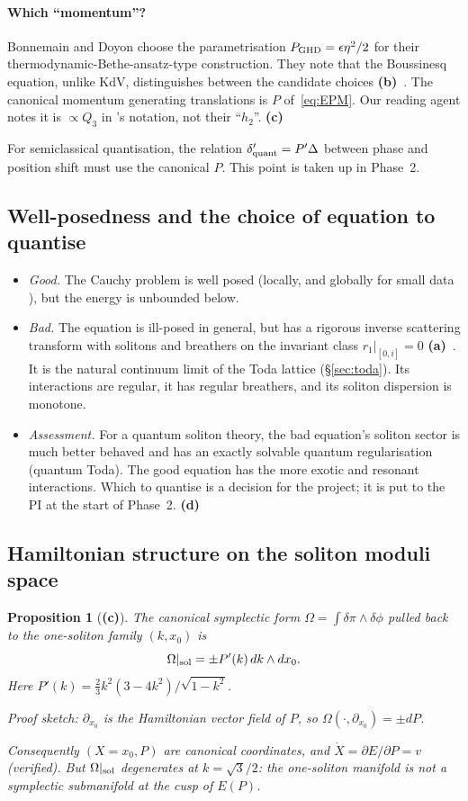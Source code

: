 \documentclass[11pt,a4paper]{article}
\newcommand{\La}{\textsf{\textbf{(a)}}}
\newcommand{\Lb}{\textsf{\textbf{(b)}}}
\newcommand{\Lc}{\textsf{\textbf{(c)}}}
\newcommand{\Ld}{\textsf{\textbf{(d)}}}
\newtheorem{proposition}{Proposition}[section]
\theoremstyle{remark}
\begin{document}
\paragraph{Which ``momentum''?} Bonnemain and Doyon choose the parametrisation $P_{\rm GHD}=\epsilon\eta^2/2$ for their thermodynamic-Bethe-ansatz-type construction. They note that the Boussinesq equation, unlike KdV, distinguishes between the candidate choices \Lb~\cite[(42)--(45)]{BD}. The canonical momentum generating translations is $P$ of~\eqref{eq:EPM}. Our reading agent notes it is $\propto Q_3$ in \cite{BD}'s notation, not their ``$h_2$''. \Lc

For semiclassical quantisation, the relation $\delta_{\rm quant}'=P'\Delta$ between phase and position shift must use the canonical $P$. This point is taken up in Phase~2.

\subsection{Well-posedness and the choice of equation to quantise}\label{sec:wellposed}

\begin{itemize}
\item \emph{Good.} The Cauchy problem is well posed (locally, and globally for small data \cite{BonaSachs}), but the energy is unbounded below.
\item \emph{Bad.} The equation is ill-posed in general, but has a rigorous inverse scattering transform with solitons and breathers on the invariant class $r_1|_{[0,i]}=0$ \La~\cite{CL-WW,CL-SOL,CL-SR}. It is the natural continuum limit of the Toda lattice (\S\ref{sec:toda}). Its interactions are regular, it has regular breathers, and its soliton dispersion is monotone.
\item \emph{Assessment.} For a quantum soliton theory, the bad equation's soliton sector is much better behaved and has an exactly solvable quantum regularisation (quantum Toda). The good equation has the more exotic and resonant interactions. Which to quantise is a decision for the project; it is put to the PI at the start of Phase~2. \Ld
\end{itemize}

\subsection{Hamiltonian structure on the soliton moduli space}

\begin{proposition}[\Lc]\label{prop:symp}
The canonical symplectic form $\Omega=\int\delta\pi\wedge\delta\phi$ pulled back to the one-soliton family $(k,x_0)$ is
\[
\Omega|_{\rm sol}=\pm P'(k)\,dk\wedge dx_0 .
\]
Here $P'(k)=\frac23k^2(3-4k^2)/\sqrt{1-k^2}$.

Proof sketch: $\partial_{x_0}$ is the Hamiltonian vector field of $P$, so $\Omega(\cdot,\partial_{x_0})=\pm dP$.

Consequently $(X=x_0,P)$ are canonical coordinates, and $\dot X=\partial E/\partial P=v$ (verified). But \emph{$\Omega|_{\rm sol}$ degenerates at $k=\sqrt3/2$}: the one-soliton manifold is not a symplectic submanifold at the cusp of $E(P)$.
\end{proposition}
\end{document}
